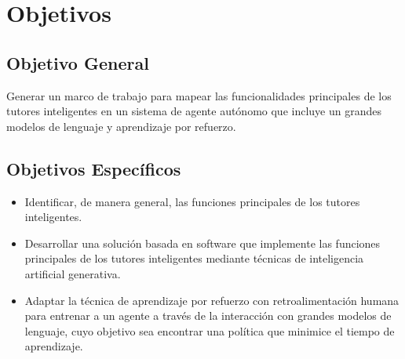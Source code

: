 
\chapter{Objetivos}


\section{Objetivo General}

Generar un marco de trabajo para mapear las funcionalidades principales de los tutores inteligentes en un sistema de agente autónomo que incluye un grandes modelos de lenguaje y aprendizaje por refuerzo.

\section{Objetivos Específicos}

\begin{itemize}
    \item Identificar, de manera general, las funciones principales de los tutores inteligentes.
    \item Desarrollar una solución basada en software que implemente las funciones principales de los tutores inteligentes mediante técnicas de inteligencia artificial generativa.
    \item Adaptar la técnica de aprendizaje por refuerzo con retroalimentación humana para entrenar a un agente a través de la interacción con grandes modelos de lenguaje, cuyo objetivo sea encontrar una política que minimice el tiempo de aprendizaje.
\end{itemize}
